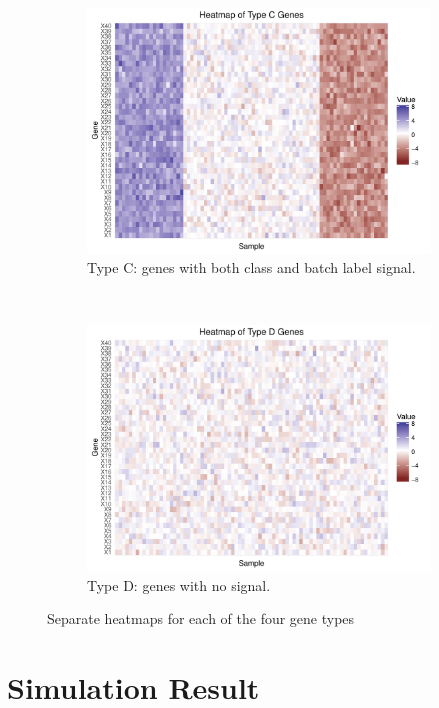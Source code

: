 \documentclass[11pt]{article}
\begin{document}
\begin{figure}[h!]
\begin{subfigure}[t]{0.4\textwidth}
    \includegraphics[width = \textwidth]{figures/Type_C_Gene.pdf}
    \caption{Type C: genes with both class and batch label signal.}
     \label{fig:type_c}
   \end{subfigure}
    ~
    \centering
    \begin{subfigure}[t]{0.4\textwidth}
    \includegraphics[width = \textwidth]{figures/Type_D_Gene.pdf}
    \caption{Type D: genes with no signal.}
    \label{fig:type_d}
    \end{subfigure}
    \caption{Separate heatmaps for each of the four gene types}
    \label{fig:heatmap}
\end{figure}



\newpage
\section{Simulation Result}
\end{document}
